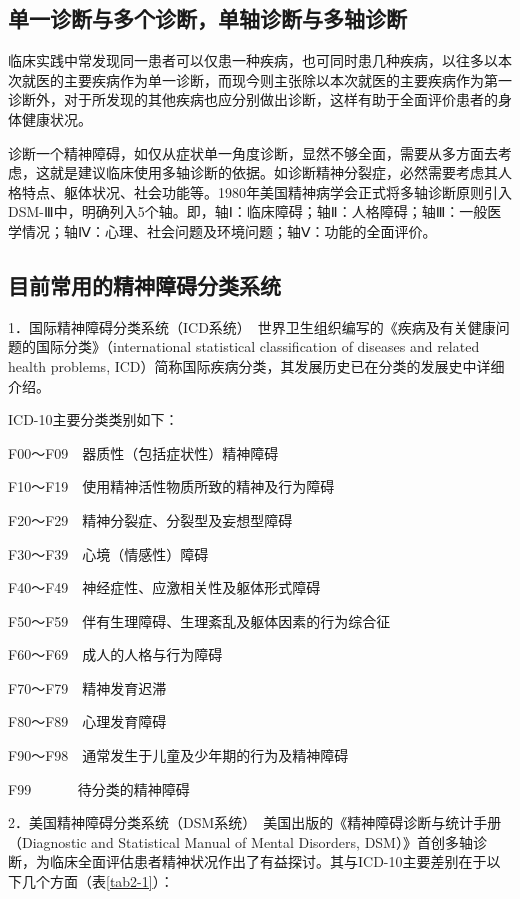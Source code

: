\subsection{单一诊断与多个诊断，单轴诊断与多轴诊断}

临床实践中常发现同一患者可以仅患一种疾病，也可同时患几种疾病，以往多以本次就医的主要疾病作为单一诊断，而现今则主张除以本次就医的主要疾病作为第一诊断外，对于所发现的其他疾病也应分别做出诊断，这样有助于全面评价患者的身体健康状况。

诊断一个精神障碍，如仅从症状单一角度诊断，显然不够全面，需要从多方面去考虑，这就是建议临床使用多轴诊断的依据。如诊断精神分裂症，必然需要考虑其人格特点、躯体状况、社会功能等。1980年美国精神病学会正式将多轴诊断原则引入DSM-Ⅲ中，明确列入5个轴。即，轴Ⅰ：临床障碍；轴Ⅱ：人格障碍；轴Ⅲ：一般医学情况；轴Ⅳ：心理、社会问题及环境问题；轴Ⅴ：功能的全面评价。

\subsection{目前常用的精神障碍分类系统}

1．国际精神障碍分类系统（ICD系统）　世界卫生组织编写的《疾病及有关健康问题的国际分类》（international
statistical classification of diseases and related health problems,
ICD）简称国际疾病分类，其发展历史已在分类的发展史中详细介绍。

ICD-10主要分类类别如下：

F00～F09　器质性（包括症状性）精神障碍

F10～F19　使用精神活性物质所致的精神及行为障碍

F20～F29　精神分裂症、分裂型及妄想型障碍

F30～F39　心境（情感性）障碍

F40～F49　神经症性、应激相关性及躯体形式障碍

F50～F59　伴有生理障碍、生理紊乱及躯体因素的行为综合征

F60～F69　成人的人格与行为障碍

F70～F79　精神发育迟滞

F80～F89　心理发育障碍

F90～F98　通常发生于儿童及少年期的行为及精神障碍

F99　　　 待分类的精神障碍

2．美国精神障碍分类系统（DSM系统）　美国出版的《精神障碍诊断与统计手册（Diagnostic
and Statistical Manual of Mental Disorders,
DSM）》首创多轴诊断，为临床全面评估患者精神状况作出了有益探讨。其与ICD-10主要差别在于以下几个方面（表\ref{tab2-1}）：

